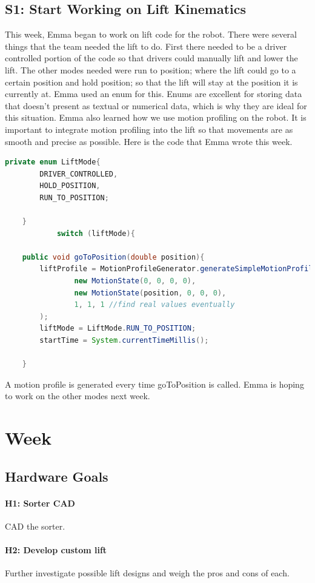 \documentclass{article}
\begin{document}
\subsection{S1: Start Working on Lift Kinematics}

This week, Emma began to work on lift code for the robot. There were several things that the team needed the lift to do. First there needed to be a driver controlled portion of the code so that drivers could manually lift and lower the lift. The other modes needed were run to position; where the lift could go to a certain position and hold position; so that the lift will stay at the position it is currently at. Emma used an enum for this. Enums are excellent for storing data that doesn't present as textual or numerical data, which is why they are ideal for this situation. Emma also learned how we use motion profiling on the robot. It is important to integrate motion profiling into the lift so that movements are as smooth and precise as possible. Here is the code that Emma wrote this week.
\begin{lstlisting}[language=Java]
    private enum LiftMode{
        DRIVER_CONTROLLED,
        HOLD_POSITION,
        RUN_TO_POSITION;

    }
            switch (liftMode){

    public void goToPosition(double position){
        liftProfile = MotionProfileGenerator.generateSimpleMotionProfile(
                new MotionState(0, 0, 0, 0),
                new MotionState(position, 0, 0, 0),
                1, 1, 1 //find real values eventually
        );
        liftMode = LiftMode.RUN_TO_POSITION;
        startTime = System.currentTimeMillis();

    }
\end{lstlisting}
A motion profile is generated every time goToPosition is called. Emma is hoping to work on the other modes next week.
\clearpage \newpage \section{Week \thesection} 
\subsection{Hardware Goals}
\paragraph{H1: Sorter CAD}
 CAD the sorter.
\paragraph{H2: Develop custom lift}
 Further investigate possible lift designs and weigh the pros and cons of each. 
\end{document}
